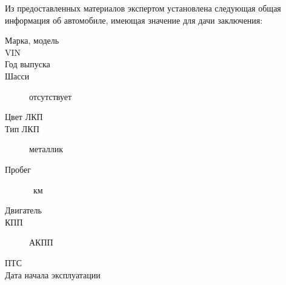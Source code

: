  \par Из предоставленных материалов   экспертом установлена следующая общая информация об автомобиле, имеющая значение для дачи заключения:\\
 \parbox[]{15cm}{
	\begin{description}
		\item[Марка, модель] \hfill {}
		\item[VIN] \hfill \vin
		\item[Год выпуска] \hfill {}
		\item[Шасси] \hfill отсутствует
		\item[Цвет ЛКП] \hfill {}
		\item[Тип ЛКП] \hfill металлик
		\item[Пробег] \hfill  {}\, км%
		\item[Двигатель] \hfill {}
		\item[КПП] \hfill АКПП
		\item[ПТС] \hfill{}	
		\item[Дата начала эксплуатации] \hfill{}
	\end{description}
}
	

